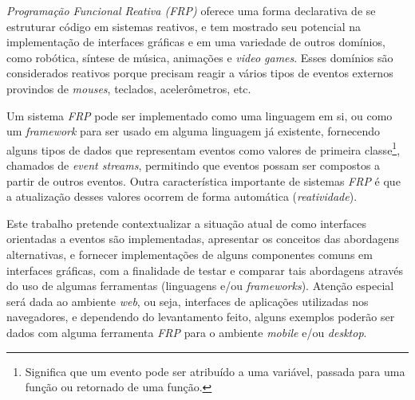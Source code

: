 
%

\emph{Programação Funcional Reativa (FRP)} oferece uma forma
declarativa de se estruturar código em sistemas reativos,
e tem mostrado seu potencial na implementação de
interfaces gráficas e em uma variedade de outros domínios,
como robótica, síntese de música, animações e
\emph{video games}. Esses domínios são considerados
reativos porque precisam reagir a vários tipos de
eventos externos provindos de \emph{mouses}, teclados,
acelerômetros, etc.

Um sistema \emph{FRP} pode ser implementado como uma
linguagem em si, ou como um \emph{framework} para ser
usado em alguma linguagem já existente, fornecendo alguns
tipos de dados que representam eventos como valores de
primeira classe\footnote{
  Significa que um evento pode ser atribuído a uma
  variável, passada para uma função ou retornado de
  uma função.
},
chamados de \emph{event streams}, permitindo que eventos
possam ser compostos a partir de outros eventos.
Outra característica importante de sistemas \emph{FRP}
é que a atualização desses valores ocorrem de forma
automática (\emph{reatividade}).


Este trabalho pretende contextualizar a situação atual
de como interfaces orientadas a eventos são implementadas,
apresentar os conceitos das abordagens alternativas, e
fornecer implementações de alguns componentes comuns em
interfaces gráficas, com a finalidade de testar e comparar
tais abordagens através do uso de algumas ferramentas
(linguagens e/ou \emph{frameworks}). Atenção especial será
dada ao ambiente \emph{web}, ou seja, interfaces de
aplicações utilizadas nos navegadores, e dependendo do
levantamento feito, alguns exemplos poderão ser dados
com alguma ferramenta \emph{FRP} para o ambiente
\emph{mobile} e/ou \emph{desktop}.
